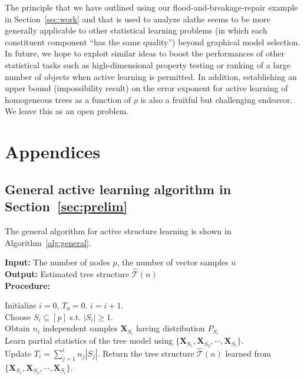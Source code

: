 \documentclass[11pt,onecolumn]{article}
\newcommand{\calT}{\mathcal{T}}
\newcommand{\hatcalT}{\hat{\calT}}
\newcommand{\bX}{\mathbf{X}}
\newtheorem{remark}{Remark}
\newcommand{\Passive}{{\rm passive}}
\begin{document}
The principle that we have outlined using our flood-and-breakage-repair example in Section~\ref{sec:work} and that is used to analyze \ac{alathe} seems to be  more generally applicable to other statistical learning problems (in which each constituent component ``has the same quality'') beyond graphical model selection. In future, we hope to exploit similar ideas to boost the performances of other statistical tasks such as high-dimensional property testing or ranking of a large number of objects when active learning is permitted. In addition, establishing an upper bound (impossibility result) on the error exponent for active learning of homogeneous trees as a function of $\rho$ is also a fruitful but challenging endeavor. We leave this as an open problem. 

\section{Appendices}\label{sec:app}

\subsection{General active learning algorithm in Section~\ref{sec:prelim}}\label{sec:appgenalgo}
The general algorithm for active structure learning is shown in Algorithm~\ref{alg:general}.
\begin{algorithm}[t]
\label{alg:general}
	\caption{General Active Structure Learning Algorithm}
	\textbf{Input:}  The number of nodes $p$, the number of vector samples $n$\\
	\textbf{Output:} Estimated tree structure $\hatcalT(n)$ \\
	\textbf{Procedure:}
	\begin{algorithmic}[1]\label{algo:generalal}
		\STATE Initialize $i=0$, $T_{0}=0$.
			\STATE $i=i+1$.\\
			\STATE Choose $S_{i}\subseteq [p]$ s.t. $|S_{i}|\geq 1$.\\
			\STATE Obtain $n_{i}$ independent samples $\bX_{S_{i}}$ having distribution $P_{S_{i}}$\\
			\STATE Learn partial statistics of the tree model using $\{\bX_{S_{1}},\bX_{S_{2}},\cdots,\bX_{S_{i}}\}$.\\
			\STATE Update $T_{i}=\sum_{j=1}^{i}n_{j}|S_{j}|$.
		\ENDWHILE
		\STATE Return the tree structure $\hatcalT(n)$ learned from $\{\bX_{S_{1}},\bX_{S_{2}},\cdots,\bX_{S_{i}}\}$.
	\end{algorithmic}
\end{algorithm}
\end{document}
